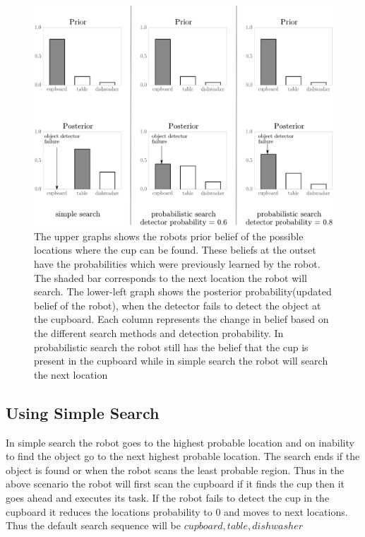 \begin{figure}[htp]
\centering
\includegraphics[width=\textwidth]{images/search.png}
\caption[Probabilistic search scenario]{The upper graphs shows the robots prior belief of the possible locations where the cup can be found. These beliefs at the outset have the probabilities which were previously learned by the robot. The shaded bar corresponds to the next location the robot will search. The lower-left graph shows the posterior probability(updated belief of the robot), when the detector fails to detect the object at the cupboard. Each column represents the change in belief based on the different search methods and detection probability. In probabilistic search the robot still has the belief that the cup is present in the cupboard while in simple search the robot will search the next location}

\label{fig:search_results}
\end{figure}

 
\subsection{Using Simple Search}

In simple search the robot goes to the highest probable location and on inability to find the object go to the next highest probable location. The search ends if the object is found or when the robot scans the least probable region. Thus in the above scenario the robot will first scan the cupboard if it finds the cup then it goes ahead and executes its task. If the robot fails to detect the cup in the cupboard it reduces the locations probability to $0$ and moves to next locations. Thus the default search sequence will be ${cupboard, table, dishwasher}$

